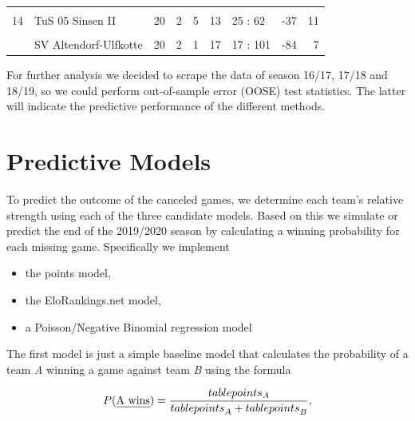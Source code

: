 \documentclass[12pt,a4paper]{article}
\begin{document}
\begin{table}[H]
{\begin{tabular}[t]{rllrrrlrr}
\cellcolor{gray!6}{13} & \cellcolor{gray!6}{SC Reken II} & \cellcolor{gray!6}{19} & \cellcolor{gray!6}{4} & \cellcolor{gray!6}{3} & \cellcolor{gray!6}{12} & \cellcolor{gray!6}{41 : 61} & \cellcolor{gray!6}{-20} & \cellcolor{gray!6}{15}\\
14 & TuS 05 Sinsen II & 20 & 2 & 5 & 13 & 25 : 62 & -37 & 11\\
\cellcolor{gray!6}{15} & \cellcolor{gray!6}{Adler Weseke II} & \cellcolor{gray!6}{20} & \cellcolor{gray!6}{2} & \cellcolor{gray!6}{4} & \cellcolor{gray!6}{14} & \cellcolor{gray!6}{23 : 64} & \cellcolor{gray!6}{-41} & \cellcolor{gray!6}{10}\\
\addlinespace
16 & SV Altendorf-Ulfkotte & 20 & 2 & 1 & 17 & 17 : 101 & -84 & 7\\
\bottomrule
\end{tabular}}
\end{table}

For further analysis we decided to scrape the data of season 16/17,
17/18 and 18/19, so we could perform out-of-sample error (OOSE) test
statistics. The latter will indicate the predictive performance of the
different methods.

\hypertarget{predictive-models}{%
\section{Predictive Models}\label{predictive-models}}

To predict the outcome of the canceled games, we determine each team's
relative strength using each of the three candidate models. Based on
this we simulate or predict the end of the 2019/2020 season by
calculating a winning probability for each missing game. Specifically we
implement

\begin{itemize}
\item the points model,
\item the EloRankings.net model, 
\item a Poisson/Negative Binomial regression model
\end{itemize}

The first model is just a simple baseline model that calculates the
probability of a team \emph{A} winning a game against team \emph{B}
using the formula

\begin{align}
P(\text{\emph{A wins}}) = \frac{table points_A}{{table points}_A + {table points}_B},
\end{align}
\end{document}
